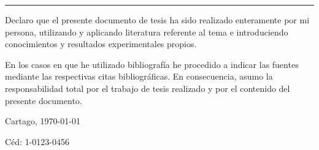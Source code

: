 \thispagestyle{empty}

\rule{10mm}{0pt}

\vfill

Declaro que el presente documento de tesis ha sido realizado enteramente
por mi persona, utilizando y aplicando literatura referente al tema e
introduciendo conocimientos y resultados experimentales propios.

En los casos en que he utilizado bibliografía he procedido a indicar las
fuentes mediante las respectivas citas bibliográficas.  En consecuencia,
asumo la responsabilidad total por el trabajo de tesis realizado y por
el contenido del presente documento.



\vspace*{8mm}

\begin{flushright}
  \thesisAuthor\par
  Cartago, \today\par
  Céd: 1-0123-0456
\end{flushright}

\cleardoublepage

